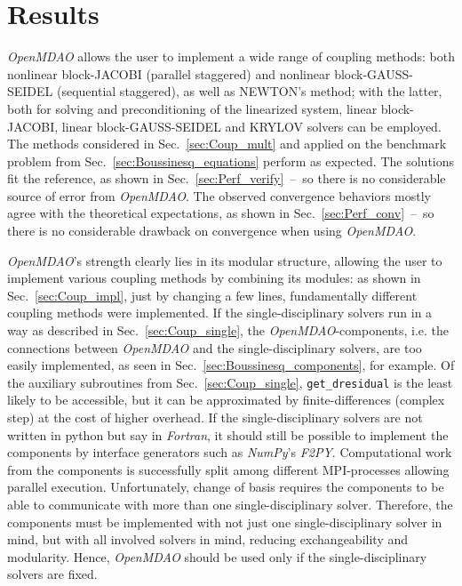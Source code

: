 \documentclass[10pt, ngerman, english,
twoside, open=right,
numbers=noenddot,
declaration=section,
abstract=section,
abstract=multiple,
abstract=notoc,
declaration=notoc,
cd=pale, 
chapterprefix=off, 
chapterpage=false, 
headingsvskip=-10em,
cdgeometry=custom, 
slantedgreek=on,
cdmath=on, 
cdfont=on,
ttfont=false,
mathswap=off,
]{tudscrreprt}
\numberwithin{equation}{chapter}
\renewcommand{\textsc}[1]{\uppercase{\mbox{#1}}}
\newcommand{\sidenote}[1]{
  \leavevmode %
  \marginpar{\hyphenpenalty=1000 \flushleft{\textcolor{HKS41}{#1}}}}
\begin{document}
\section{Results}\label{sec:End_results}
\sidenote{Coupling Capabilities}\textit{OpenMDAO} allows the user to implement a wide range of coupling methods: both nonlinear block-\textsc{Jacobi} (parallel staggered) and nonlinear block-\textsc{Gau\ss}-\textsc{Seidel} (sequential staggered), as well as \textsc{Newton}'s method; with the latter, both for solving and preconditioning of the linearized system, linear block-\textsc{Jacobi}, linear block-\textsc{Gau\ss}-\textsc{Seidel} and \textsc{Krylov} solvers can be employed. The methods considered in Sec.~\ref{sec:Coup_mult} and applied on the benchmark problem from Sec.~\ref{sec:Boussinesq_equations} perform as expected. The solutions fit the reference, as shown in Sec.~\ref{sec:Perf_verify}~--~so there is no considerable source of error from \textit{OpenMDAO}. The observed convergence behaviors mostly agree with the theoretical expectations, as shown in Sec.~\ref{sec:Perf_conv}~--~so there is no considerable drawback on convergence when using \textit{OpenMDAO}.\par
\sidenote{Implementation}\textit{OpenMDAO}'s strength clearly lies in its modular structure, allowing the user to implement various coupling methods by combining its modules: as shown in Sec.~\ref{sec:Coup_impl}, just by changing a few lines, fundamentally different coupling methods were implemented. 
If the single-disciplinary solvers run in a way as described in Sec.~\ref{sec:Coup_single}, the \textit{OpenMDAO}-components, i.e. the connections between \textit{OpenMDAO} and the single-disciplinary solvers, are too easily implemented, as seen in Sec.~\ref{sec:Boussinesq_components}, for example.
Of the auxiliary subroutines from Sec.~\ref{sec:Coup_single}, \texttt{get\_dresidual} is the least likely to be accessible, but it can be approximated by finite-differences (complex step) at the cost of higher overhead.
If the single-disciplinary solvers are not written in python but say in \textit{Fortran}, it should still be possible to implement the components by interface generators such as \textit{NumPy}'s \textit{F2PY}.
Computational work from the components is successfully split among different MPI-processes allowing parallel execution.
Unfortunately, change of basis requires the components to be able to communicate with more than one single-disciplinary solver. Therefore, the components must be implemented with not just one single-disciplinary solver in mind, but with all involved solvers in mind, reducing exchangeability and modularity. Hence, \textit{OpenMDAO} should be used only if the single-disciplinary solvers are fixed.
\end{document}
